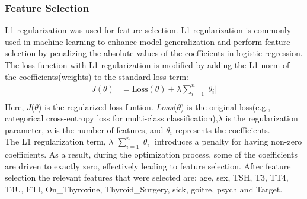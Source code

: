 \subsubsection{Feature Selection}
L1 regularization was used for feature selection. L1 regularization is commonly used in machine learning to enhance model generalization and perform
feature selection by penalizing the absolute values of the coefficients in logistic regression. The loss function with L1 regularization is modified by adding the L1 norm of the coefficients(weights) to the standard loss term:
\begin{equation}
\begin{aligned}
J(\theta) &= \text{Loss}(\theta) + \lambda \sum_{i=1}^{n} |\theta_i| \\
\end{aligned}
\end{equation}Here, $J$($\theta$) is the regularized loss funtion. $Loss$($\theta$) is the original loss(e.g., categorical cross-entropy loss for multi-class classification),$\lambda$ is the regularization parameter, \textit{n} is the number of features, and \( \theta_i \) represents the coefficients.\\
The L1 regularization term, $\lambda$ $\sum_{i=1}^{n} | \theta_{i} | $ introduces a penalty for having non-zero coefficients. As a result, during the optimization process, some of the coefficients are driven to exactly zero, effectively leading to feature selection\cite{ng}.
After feature selection the relevant features that were selected are: age, sex, TSH, T3, TT4, T4U, FTI, On\_Thyroxine, Thyroid\_Surgery, sick, goitre, psych and Target.\\
